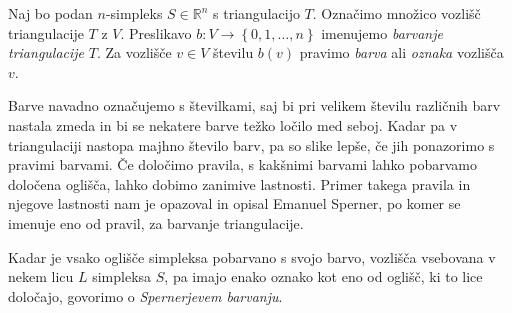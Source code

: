 \documentclass[mat1]{fmfdelo}
\newcommand{\R}{\mathbb R}
\newcommand{\0}{\underline{0}}
\begin{document}
\begin{definicija}
Naj bo podan $n$-simpleks $S \in \R^n$ s triangulacijo $T$. Označimo množico vozlišč triangulacije $T$ z $V$. Preslikavo $b : V \to \left \{0, 1, \dots, n \right \} $ imenujemo \emph{barvanje triangulacije} $T$. Za vozlišče $v \in V$ številu $b(v)$ pravimo \emph{barva} ali \emph{oznaka} vozlišča $v$.
\end{definicija}
Barve navadno označujemo s številkami, saj bi pri velikem številu različnih barv nastala zmeda in bi se nekatere barve težko ločilo med seboj. Kadar pa v triangulaciji nastopa majhno število barv, pa so slike lepše, če jih ponazorimo s pravimi barvami. Če določimo pravila, s kakšnimi barvami lahko pobarvamo določena oglišča, lahko dobimo zanimive lastnosti. Primer takega pravila in njegove lastnosti nam je opazoval in opisal Emanuel Sperner, po komer se imenuje eno od pravil, za barvanje triangulacije.
\begin{definicija}
Kadar je vsako oglišče simpleksa pobarvano s svojo barvo, vozlišča vsebovana v nekem licu $L$ simpleksa $S$, pa imajo enako oznako kot eno od oglišč, ki to lice določajo, govorimo o \emph{Spernerjevem barvanju}.
\end{definicija}
\newcommand*\rows{6}
\newcommand*\vel{1.8}
\end{document}
